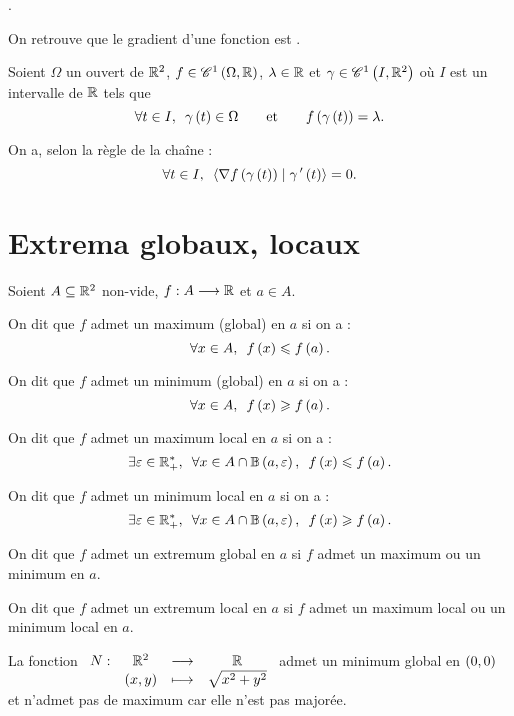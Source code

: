 \begin{ex}
\Cf {}.
\end{ex}

\begin{rem}
On retrouve que le gradient d'une fonction est .

Soient \(\Omega\) un ouvert de \(\mathbb{R}^2\), \(f\in\mathscr{C}^{1}\left(\Omega,\mathbb{R}\right)\), \(\lambda\in\mathbb{R}\) et \(\gamma\in\mathscr{C}^{1}\left(I,\mathbb{R}^2\right)\) où \(I\) est un intervalle de \(\mathbb{R}\) tels que \[\quantifs{\forall t\in I}\gamma\paren{t}\in\Omega\qquad\text{et}\qquad f\paren{\gamma\paren{t}}=\lambda.\]

On a, selon la règle de la chaîne : \[\quantifs{\forall t\in I}\ps{\nabla f\paren{\gamma\paren{t}}}{\gamma\prim\paren{t}}=0.\]
\end{rem}

\section{Extrema globaux, locaux}

\begin{defi}
Soient \(A\subseteq\mathbb{R}^2\) non-vide, \(f:A\longrightarrow\mathbb{R}\) et \(a\in A\).

On dit que \(f\) admet un maximum (global) en \(a\) si on a : \[\quantifs{\forall x\in A}f\paren{x}\leq f\paren{a}.\]

On dit que \(f\) admet un minimum (global) en \(a\) si on a : \[\quantifs{\forall x\in A}f\paren{x}\geq f\paren{a}.\]

On dit que \(f\) admet un maximum local en \(a\) si on a : \[\quantifs{\exists\epsilon\in\Rps;\forall x\in A\inter\bouleo{a}{\epsilon}}f\paren{x}\leq f\paren{a}.\]

On dit que \(f\) admet un minimum local en \(a\) si on a : \[\quantifs{\exists\epsilon\in\Rps;\forall x\in A\inter\bouleo{a}{\epsilon}}f\paren{x}\geq f\paren{a}.\]

On dit que \(f\) admet un extremum global en \(a\) si \(f\) admet un maximum ou un minimum en \(a\).

On dit que \(f\) admet un extremum local en \(a\) si \(f\) admet un maximum local ou un minimum local en \(a\).
\end{defi}

\begin{ex}
La fonction \(\begin{array}[t]{cccc}N : & \mathbb{R}^2 & \longrightarrow & \mathbb{R} \\ & \left(x,y\right) & \longmapsto & \sqrt{x^2+y^2}\end{array}\) admet un minimum global en \(\left(0,0\right)\) et n'admet pas de maximum car elle n'est pas majorée.
\end{ex}

